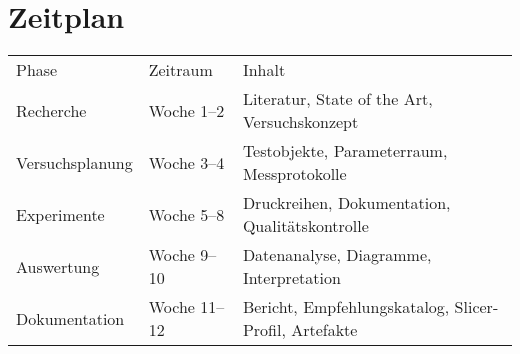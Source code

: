 \chapter{Zeitplan}
\label{cha:Zeitplan}

\begin{center}
\begin{tabular}{@{}llp{8cm}@{}}

Phase & Zeitraum & Inhalt \\

Recherche & Woche 1--2 & Literatur, State of the Art, Versuchskonzept \\
Versuchsplanung & Woche 3--4 & Testobjekte, Parameterraum, Messprotokolle \\
Experimente & Woche 5--8 & Druckreihen, Dokumentation, Qualitätskontrolle \\
Auswertung & Woche 9--10 & Datenanalyse, Diagramme, Interpretation \\
Dokumentation & Woche 11--12 & Bericht, Empfehlungskatalog, Slicer-Profil, Artefakte \\

\end{tabular}
\end{center}